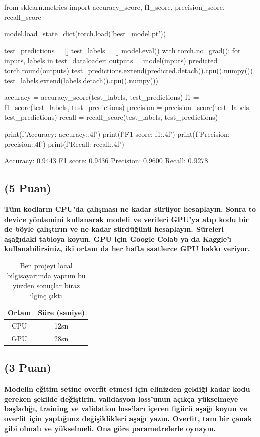 \documentclass[11pt]{article}
\begin{document}
\begin{python}
from sklearn.metrics import accuracy_score, f1_score, precision_score, recall_score

model.load_state_dict(torch.load('best_model.pt'))

test_predictions = []
test_labels = []
model.eval()
with torch.no_grad():
    for inputs, labels in test_dataloader:
        outputs = model(inputs)
        predicted = torch.round(outputs)
        test_predictions.extend(predicted.detach().cpu().numpy())
        test_labels.extend(labels.detach().cpu().numpy())

accuracy = accuracy_score(test_labels, test_predictions)
f1 = f1_score(test_labels, test_predictions)
precision = precision_score(test_labels, test_predictions)
recall = recall_score(test_labels, test_predictions)

print(f'Accuracy: {accuracy:.4f}')
print(f'F1 score: {f1:.4f}')
print(f'Precision: {precision:.4f}')
print(f'Recall: {recall:.4f}')
\end{python}

Accuracy: 0.9443
F1 score: 0.9436
Precision: 0.9600
Recall: 0.9278

\subsection{(5 Puan)} \textbf{Tüm kodların CPU'da çalışması ne kadar sürüyor hesaplayın. Sonra to device yöntemini kullanarak modeli ve verileri GPU'ya atıp kodu bir de böyle çalıştırın ve ne kadar sürdüğünü hesaplayın. Süreleri aşağıdaki tabloya koyun. GPU için Google Colab ya da Kaggle'ı kullanabilirsiniz, iki ortam da her hafta saatlerce GPU hakkı veriyor.}

\begin{table}[ht!]
    \centering
    \caption{Ben projeyi local bilgisayarımda yaptım bu yüzden sonuçlar biraz ilginç çıktı}
    \begin{tabular}{c|c}
        Ortam & Süre (saniye) \\\hline
        CPU & 12sn \\
        GPU & 28sn\\
    \end{tabular}
    \label{tab:my_table}
\end{table}

\subsection{(3 Puan)} \textbf{Modelin eğitim setine overfit etmesi için elinizden geldiği kadar kodu gereken şekilde değiştirin, validasyon loss'unun açıkça yükselmeye başladığı, training ve validation loss'ları içeren figürü aşağı koyun ve overfit için yaptığınız değişiklikleri aşağı yazın. Overfit, tam bir çanak gibi olmalı ve yükselmeli. Ona göre parametrelerle oynayın.}
\end{document}
